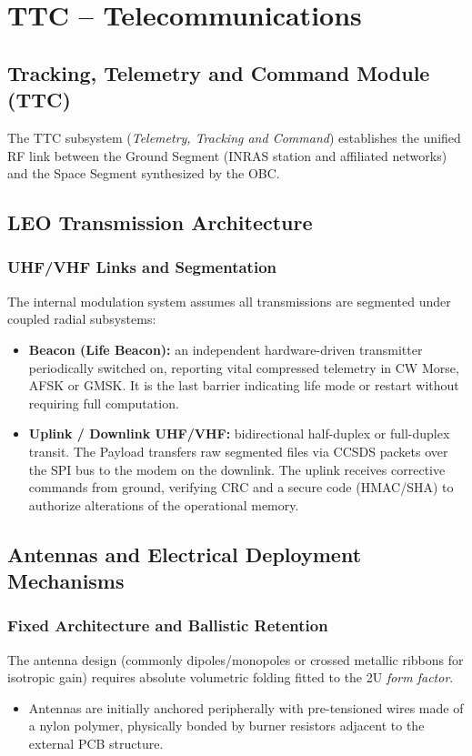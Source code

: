 \chapter{TTC – Telecommunications}

\section{Tracking, Telemetry and Command Module (TTC)}
The TTC subsystem (\textit{Telemetry, Tracking and Command}) establishes the unified RF link between the Ground Segment (INRAS station and affiliated networks) and the Space Segment synthesized by the OBC.

\section{LEO Transmission Architecture}

\subsection{UHF/VHF Links and Segmentation}
The internal modulation system assumes all transmissions are segmented under coupled radial subsystems:
\begin{itemize}
    \item \textbf{Beacon (Life Beacon):} an independent hardware-driven transmitter periodically switched on, reporting vital compressed telemetry in CW Morse, AFSK or GMSK. It is the last barrier indicating life mode or restart without requiring full computation.
    \item \textbf{Uplink / Downlink UHF/VHF:} bidirectional half-duplex or full-duplex transit. The Payload transfers raw segmented files via CCSDS packets over the SPI bus to the modem on the downlink. The uplink receives corrective commands from ground, verifying CRC and a secure code (HMAC/SHA) to authorize alterations of the operational memory.
\end{itemize}

\section{Antennas and Electrical Deployment Mechanisms}
\subsection{Fixed Architecture and Ballistic Retention}
The antenna design (commonly dipoles/monopoles or crossed metallic ribbons for isotropic gain) requires absolute volumetric folding fitted to the 2U \textit{form factor}.
\begin{itemize}
    \item Antennas are initially anchored peripherally with pre-tensioned wires made of a nylon polymer, physically bonded by burner resistors adjacent to the external PCB structure.
\end{itemize}

